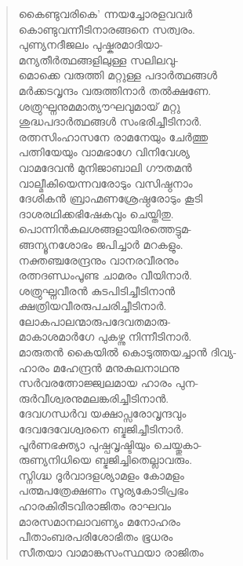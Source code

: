 \begin{verse}
കൈണ്ടുവരികെ’ ന്നയച്ചോരളവവര്‍\\
കൊണ്ടുവന്നീടിനാരങ്ങനെ സത്വരം.\\
പുണ്യനദീജലം പുഷ്കരമാദിയാ-\\
മന്യതീര്‍ത്ഥങ്ങളിലുള്ള സലിലവു-\\
മൊക്കെ വരുത്തി മറ്റുള്ള പദാര്‍ത്ഥങ്ങള്‍\\
മര്‍ക്കടവൃന്ദം വരുത്തിനാര്‍ തല്‍ക്ഷണേ.\\
ശത്രുഘ്നനുമമാത്യൗഘവുമായ് മറ്റു\\
ശുദ്ധപദാര്‍ത്ഥങ്ങള്‍ സംഭരിച്ചീടിനാര്‍.\\
രത്നസിംഹാസനേ രാമനേയും ചേര്‍ത്തു\\
പത്നിയേയും വാമഭാഗേ വിനിവേശ്യ\\
വാമദേവന്‍ മുനിജാബാലി ഗൗതമന്‍\\
വാല്മീകിയെന്നവരോടും വസിഷ്ഠനാം\\
ദേശികന്‍ ബ്രാഹ്മണശ്രേഷ്ഠരോടും കൂടി\\
ദാശരഥിക്കഭിഷേകവും ചെയ്തിതു.\\
പൊന്നിന്‍കലശങ്ങളായിരത്തെട്ടുമ-\\
ങ്ങന്യൂനശോഭം ജപിച്ചാര്‍ മറകളും.\\
നക്തഞ്ചരേന്ദ്രനും വാനരവീരനും\\
രത്നദണ്ഡംപൂണ്ട ചാമരം വീയിനാര്‍.\\
ശത്രുഘ്നവീരന്‍ കുടപിടിച്ചീടിനാന്‍\\
ക്ഷത്രിയവീരരുപചരിച്ചീടിനാര്‍.\\
ലോകപാലന്മാരുപദേവതമാരു-\\
മാകാശമാര്‍ഗേ പുകഴ്ന്നു നിന്നീടിനാര്‍.\\
മാരുതന്‍ കൈയില്‍ കൊടുത്തയച്ചാന്‍ ദിവ്യ-\\
ഹാരം മഹേന്ദ്രന്‍ മനുകുലനാഥനു\\
സര്‍വരത്നോജ്ജ്വലമായ ഹാരം പുന-\\
രുര്‍വീശ്വരനുമലങ്കരിച്ചീടിനാന്‍.\\
ദേവഗന്ധര്‍വ യക്ഷാപ്സരോവൃന്ദവും\\
ദേവദേവേശ്വരനെ ബ്ഭജിച്ചീടിനാര്‍.\\
പൂര്‍ണഭക്ത്യാ പുഷ്പവൃഷ്ടിയും ചെയ്തുകാ-\\
രുണ്യനിധിയെ ബ്ഭജിച്ചിതെല്ലാവരും.\\
സ്നിഗ്ദ്ധ ദൂര്‍വാദളശ്യാമളം കോമളം\\
പത്മപത്രേക്ഷണം സൂര്യകോടിപ്രഭം\\
ഹാരകിരീടവിരാജിതം രാഘവം\\
മാരസമാനലാവണ്യം മനോഹരം\\
പീതാംബരപരിശോഭിതം ഭൂധരം\\
സീതയാ വാമാങ്കസംസ്ഥയാ രാജിതം\\

\end{verse}
